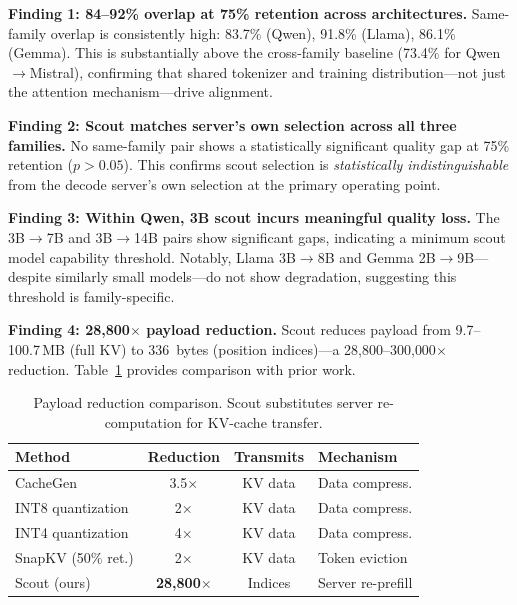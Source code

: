 \documentclass{article}
\begin{document}
\textbf{Finding 1: 84--92\% overlap at 75\% retention across architectures.}
Same-family overlap is consistently high: 83.7\% (Qwen), 91.8\% (Llama), 86.1\% (Gemma).
This is substantially above the cross-family baseline (73.4\% for Qwen$\to$Mistral), confirming that shared tokenizer and training distribution---not just the attention mechanism---drive alignment.

\textbf{Finding 2: Scout matches server's own selection across all three families.}
No same-family pair shows a statistically significant quality gap at 75\% retention ($p > 0.05$).
This confirms scout selection is \emph{statistically indistinguishable} from the decode server's own selection at the primary operating point.

\textbf{Finding 3: Within Qwen, 3B scout incurs meaningful quality loss.}
The 3B$\to$7B and 3B$\to$14B pairs show significant gaps, indicating a minimum scout model capability threshold.
Notably, Llama 3B$\to$8B and Gemma 2B$\to$9B---despite similarly small models---do not show degradation, suggesting this threshold is family-specific.

\textbf{Finding 4: 28{,}800$\times$ payload reduction.}
Scout reduces payload from 9.7--100.7\,MB (full KV) to 336~bytes (position indices)---a 28{,}800--300{,}000$\times$ reduction.
Table~\ref{tab:compression_comparison} provides comparison with prior work.

\begin{table}[t]
\centering
\caption{Payload reduction comparison. Scout substitutes server re-computation for KV-cache transfer.}
\label{tab:compression_comparison}
\small
\begin{tabular}{@{}lccl@{}}
\toprule
\textbf{Method} & \textbf{Reduction} & \textbf{Transmits} & \textbf{Mechanism} \\
\midrule
CacheGen~\citep{cachegen}  & 3.5$\times$  & KV data  & Data compress. \\
INT8 quantization          & 2$\times$    & KV data  & Data compress. \\
INT4 quantization          & 4$\times$    & KV data  & Data compress. \\
SnapKV (50\% ret.)         & 2$\times$    & KV data  & Token eviction \\
Scout (ours)               & \textbf{28,800}$\times$ & Indices & Server re-prefill \\
\bottomrule
\end{tabular}
\end{table}
\end{document}
